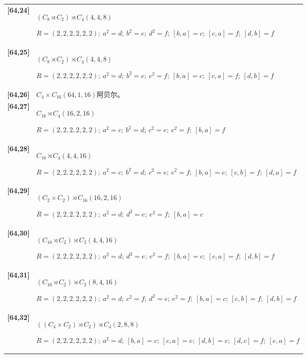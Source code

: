 \documentclass[UTF8,fontset=fandol,11pt,a4paper]{ctexart}
\begin{document}
\begin{longtable}{@{}p{17mm}>{\raggedright\arraybackslash}p{141mm}@{}}
\textbf{[64,24]} & $(C_{8}\rtimes C_{2})\rtimes C_{4}$\quad $(4,4,8)$\par\(R=(2,2,2,2,2,2);\allowbreak\ a^{2}=d;\allowbreak\ b^{2}=e;\allowbreak\ d^{2}=f;\allowbreak\ [b,a]=c;\allowbreak\ [c,a]=f;\allowbreak\ [d,b]=f\)\\[3pt]

\textbf{[64,25]} & $(C_{8}\rtimes C_{2})\rtimes C_{4}$\quad $(4,4,8)$\par\(R=(2,2,2,2,2,2);\allowbreak\ a^{2}=d;\allowbreak\ b^{2}=e;\allowbreak\ e^{2}=f;\allowbreak\ [b,a]=c;\allowbreak\ [c,a]=f;\allowbreak\ [d,b]=f\)\\[3pt]

\textbf{[64,26]} & $C_{4}\times C_{16}$\quad $(64,1,16)$\quad 阿贝尔。\\[3pt]

\textbf{[64,27]} & $C_{16}\rtimes C_{4}$\quad $(16,2,16)$\par\(R=(2,2,2,2,2,2);\allowbreak\ a^{2}=c;\allowbreak\ b^{2}=d;\allowbreak\ c^{2}=e;\allowbreak\ e^{2}=f;\allowbreak\ [b,a]=f\)\\[3pt]

\textbf{[64,28]} & $C_{16}\rtimes C_{4}$\quad $(4,4,16)$\par\(R=(2,2,2,2,2,2);\allowbreak\ a^{2}=c;\allowbreak\ b^{2}=d;\allowbreak\ c^{2}=e;\allowbreak\ e^{2}=f;\allowbreak\ [b,a]=e;\allowbreak\ [c,b]=f;\allowbreak\ [d,a]=f\)\\[3pt]

\textbf{[64,29]} & $(C_{2}\times C_{2})\rtimes C_{16}$\quad $(16,2,16)$\par\(R=(2,2,2,2,2,2);\allowbreak\ a^{2}=d;\allowbreak\ d^{2}=e;\allowbreak\ e^{2}=f;\allowbreak\ [b,a]=c\)\\[3pt]

\textbf{[64,30]} & $(C_{16}\rtimes C_{2})\rtimes C_{2}$\quad $(4,4,16)$\par\(R=(2,2,2,2,2,2);\allowbreak\ a^{2}=d;\allowbreak\ d^{2}=e;\allowbreak\ e^{2}=f;\allowbreak\ [b,a]=c;\allowbreak\ [c,a]=f;\allowbreak\ [d,b]=f\)\\[3pt]

\textbf{[64,31]} & $(C_{16}\rtimes C_{2})\rtimes C_{2}$\quad $(8,4,16)$\par\(R=(2,2,2,2,2,2);\allowbreak\ a^{2}=d;\allowbreak\ c^{2}=f;\allowbreak\ d^{2}=e;\allowbreak\ e^{2}=f;\allowbreak\ [b,a]=c;\allowbreak\ [c,b]=f;\allowbreak\ [d,b]=f\)\\[3pt]

\textbf{[64,32]} & $((C_{4}\times C_{2})\rtimes C_{2})\rtimes C_{4}$\quad $(2,8,8)$\par\(R=(2,2,2,2,2,2);\allowbreak\ a^{2}=d;\allowbreak\ [b,a]=c;\allowbreak\ [c,a]=e;\allowbreak\ [d,b]=e;\allowbreak\ [d,c]=f;\allowbreak\ [e,a]=f\)\\[3pt]


\end{longtable}
\end{document}
